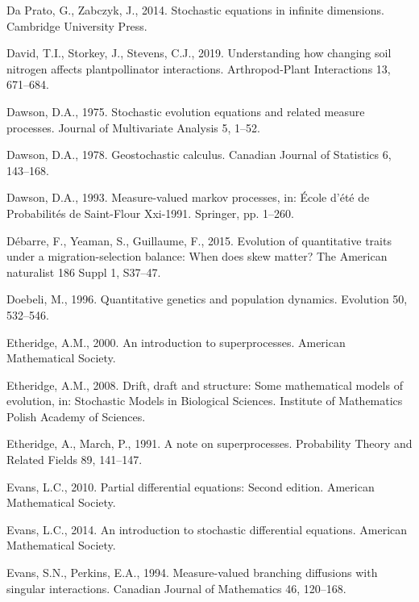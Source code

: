 \documentclass[]{elsarticle} %
\begin{document}
\leavevmode\hypertarget{ref-DaPrato2014}{}%
Da Prato, G., Zabczyk, J., 2014. Stochastic equations in infinite
dimensions. Cambridge University Press.

\leavevmode\hypertarget{ref-David2019}{}%
David, T.I., Storkey, J., Stevens, C.J., 2019. Understanding how
changing soil nitrogen affects plantpollinator interactions.
Arthropod-Plant Interactions 13, 671--684.

\leavevmode\hypertarget{ref-Dawson1975}{}%
Dawson, D.A., 1975. Stochastic evolution equations and related measure
processes. Journal of Multivariate Analysis 5, 1--52.

\leavevmode\hypertarget{ref-Dawson1978}{}%
Dawson, D.A., 1978. Geostochastic calculus. Canadian Journal of
Statistics 6, 143--168.

\leavevmode\hypertarget{ref-dawson1993measure}{}%
Dawson, D.A., 1993. Measure-valued markov processes, in: École d'été de
Probabilités de Saint-Flour Xxi-1991. Springer, pp. 1--260.

\leavevmode\hypertarget{ref-Dbarre2015EvolutionOQ}{}%
Débarre, F., Yeaman, S., Guillaume, F., 2015. Evolution of quantitative
traits under a migration-selection balance: When does skew matter? The
American naturalist 186 Suppl 1, S37--47.

\leavevmode\hypertarget{ref-Doebeli1996}{}%
Doebeli, M., 1996. Quantitative genetics and population dynamics.
Evolution 50, 532--546.

\leavevmode\hypertarget{ref-alisonetheridge2000}{}%
Etheridge, A.M., 2000. An introduction to superprocesses. American
Mathematical Society.

\leavevmode\hypertarget{ref-Etheridge2008}{}%
Etheridge, A.M., 2008. Drift, draft and structure: Some mathematical
models of evolution, in: Stochastic Models in Biological Sciences.
Institute of Mathematics Polish Academy of Sciences.

\leavevmode\hypertarget{ref-Etheridge1991}{}%
Etheridge, A., March, P., 1991. A note on superprocesses. Probability
Theory and Related Fields 89, 141--147.

\leavevmode\hypertarget{ref-lawrenceevans2010}{}%
Evans, L.C., 2010. Partial differential equations: Second edition.
American Mathematical Society.

\leavevmode\hypertarget{ref-9781470410544}{}%
Evans, L.C., 2014. An introduction to stochastic differential equations.
American Mathematical Society.

\leavevmode\hypertarget{ref-Evans1994}{}%
Evans, S.N., Perkins, E.A., 1994. Measure-valued branching diffusions
with singular interactions. Canadian Journal of Mathematics 46,
120--168.
\end{document}
